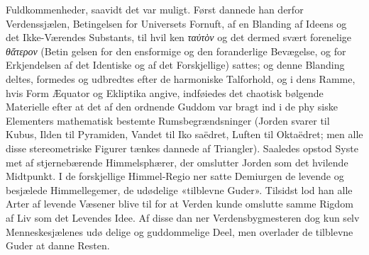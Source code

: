 \documentclass[12pt,a4paper]{book}
\newcommand{\gk}[1]{\textit{#1}}
\begin{document}
Fuldkommenheder, saavidt det var muligt. Først dannede han
derfor Verdenssjælen, Betingelsen for Universets Fornuft, af en
Blanding af Ideens og det Ikke-Værendes Substants, til hvil\-%
ken \gk{ταὐτὸν} og det dermed svært forenelige \gk{θἄτερον} (Betin\-%
gelsen for den ensformige og den foranderlige Bevægelse, og
for Erkjendelsen af det Identiske og af det Forskjellige) sattes;
og denne Blanding deltes, formedes og udbredtes efter de
harmoniske Talforhold, og i dens Ramme, hvis Form Æquator
og Ekliptika angive, indføiedes det chaotisk bølgende Materielle
efter at det af den ordnende Guddom var bragt ind i de phy\-%
siske Elementers mathematisk bestemte Rumsbegrændsninger
(Jorden svarer til Kubus, Ilden til Pyramiden, Vandet til Iko\-%
saëdret, Luften til Oktaëdret; men alle disse stereometriske
Figurer tænkes dannede af Triangler). Saaledes opstod Syste\-%
met af stjernebærende Himmelsphærer, der omslutter Jorden
som det hvilende Midtpunkt. I de forskjellige Himmel-Regio\-%
ner satte Demiurgen de levende og besjælede Himmellegemer,
de udødelige «tilblevne Guder». Tilsidst lod han alle Arter
af levende Væsener blive til for at Verden kunde omslutte
samme Rigdom af Liv som det Levendes Idee. Af disse dan\-%
ner Verdensbygmesteren dog kun selv Menneskesjælenes udø\-%
delige og guddommelige Deel, men overlader de tilblevne Guder
at danne Resten.
\end{document}
